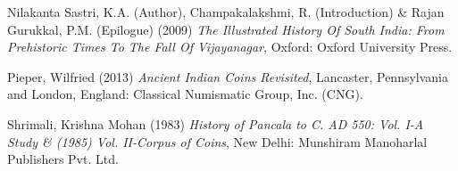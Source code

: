 \begin{thebibliography}{99}
  Nilakanta Sastri, K.A. (Author), Champakalakshmi, R. (Introduction) \& Rajan Gurukkal, P.M. (Epilogue) (2009) \textit{The Illustrated History Of South India: From Prehistoric Times To The Fall Of Vijayanagar}, Oxford: Oxford University Press.

  Pieper, Wilfried (2013) \textit{Ancient Indian Coins Revisited}, Lancaster, Pennsylvania and London, England: Classical Numismatic Group, Inc. (CNG).

  Shrimali, Krishna Mohan (1983) \textit{History of Pancala to C. AD 550: Vol. I-A Study \& (1985) Vol. II-Corpus of Coins}, New Delhi: Munshiram Manoharlal Publishers Pvt. Ltd.

 \end{thebibliography}

